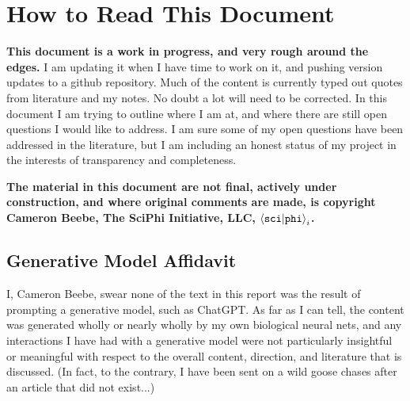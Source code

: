 \tableofcontents




\section{How to Read This Document}

\textbf{This document is a work in progress, and very rough around the edges.} I am updating it when I have time to work on it, and pushing version updates to a github repository.  Much of the content is currently typed out quotes from literature and my notes.  No doubt a lot will need to be corrected.  In this document I am trying to outline where I am at, and where there are still open questions I would like to address.  I am sure some of my open questions have been addressed in the literature, but I am including an honest status of my project in the interests of transparency and completeness.  

\textbf{The material in this document are not final, actively under construction, and where original comments are made, is copyright Cameron Beebe, The SciPhi Initiative, LLC, $\braket{\texttt{sci}|\texttt{phi}}_i$.}




\subsection{Generative Model Affidavit}

I, Cameron Beebe, swear none of the text in this report was the result of prompting a generative model, such as ChatGPT.  As far as I can tell, the content was generated wholly or nearly wholly by my own biological neural nets, and any interactions I have had with a generative model were not particularly insightful or meaningful with respect to the overall content, direction, and literature that is discussed.  (In fact, to the contrary, I have been sent on a wild goose chases after an article that did not exist...)

